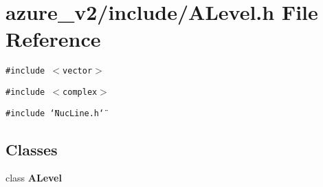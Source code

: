 \section{azure\_\-v2/include/ALevel.h File Reference}
\label{ALevel_8h}
{\tt \#include $<$vector$>$}\par
{\tt \#include $<$complex$>$}\par
{\tt \#include \char`\"{}Nuc\-Line.h\char`\"{}}\par
\subsection*{Classes}
\begin{CompactItemize}
\item 
class \bf{ALevel}
\end{CompactItemize}
